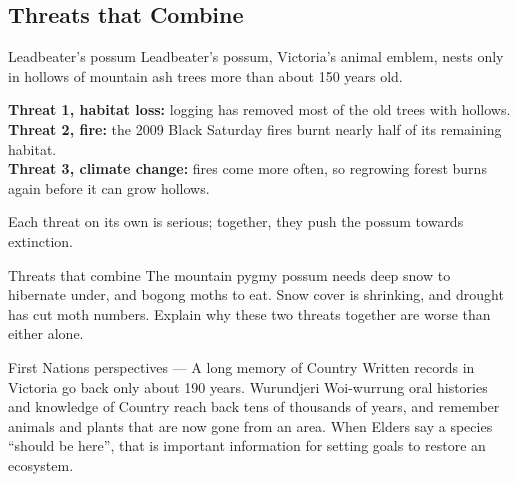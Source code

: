 \subsection{Threats that Combine}\label{sub:10.2}

\begin{workedex}{Leadbeater's possum}
Leadbeater's possum, Victoria's animal emblem, nests only in hollows of mountain ash trees more than about 150 years old.

\smallskip
\textbf{Threat 1, habitat loss:} logging has removed most of the old trees with hollows.\\
\textbf{Threat 2, fire:} the 2009 Black Saturday fires burnt nearly half of its remaining habitat.\\
\textbf{Threat 3, climate change:} fires come more often, so regrowing forest burns again before it can grow hollows.

\smallskip
Each threat on its own is serious; together, they push the possum towards extinction.
\end{workedex}

\begin{wedo}{Threats that combine}
The mountain pygmy possum needs deep snow to hibernate under, and bogong moths to eat. Snow cover is shrinking, and drought has cut moth numbers. Explain why these two threats together are worse than either alone.
\answerbox{5cm}
\end{wedo}

\begin{countrybox}{First Nations perspectives --- A long memory of Country}
Written records in Victoria go back only about 190 years. Wurundjeri Woi-wurrung oral histories and knowledge of Country reach back tens of thousands of years, and remember animals and plants that are now gone from an area. When Elders say a species ``should be here'', that is important information for setting goals to restore an ecosystem.
\end{countrybox}

\label{prac:10}

